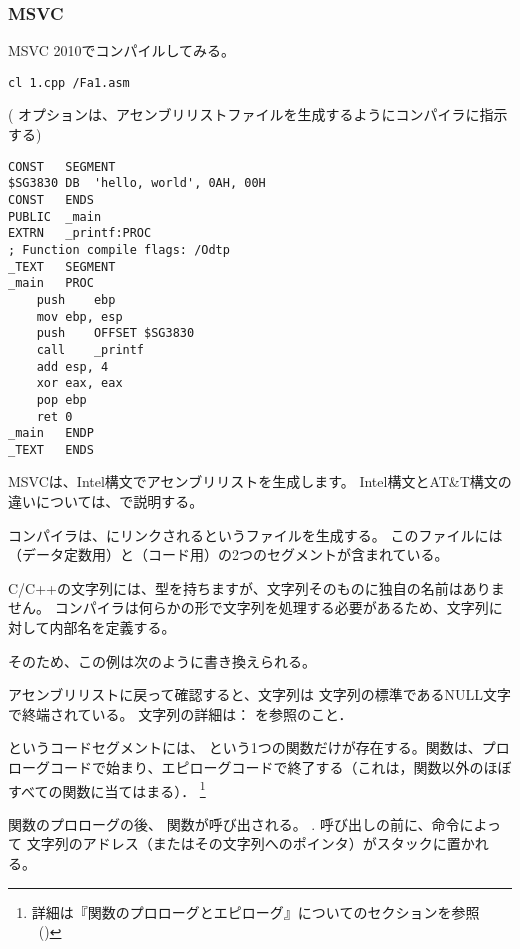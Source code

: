 \subsubsection{MSVC}

MSVC 2010でコンパイルしてみる。

\begin{lstlisting}
cl 1.cpp /Fa1.asm
\end{lstlisting}

( オプションは、アセンブリリストファイルを生成するようにコンパイラに指示する)

\begin{lstlisting}[caption=MSVC 2010,style=customasmx86]
CONST	SEGMENT
$SG3830	DB	'hello, world', 0AH, 00H
CONST	ENDS
PUBLIC	_main
EXTRN	_printf:PROC
; Function compile flags: /Odtp
_TEXT	SEGMENT
_main	PROC
	push	ebp
	mov	ebp, esp
	push	OFFSET $SG3830
	call	_printf
	add	esp, 4
	xor	eax, eax
	pop	ebp
	ret	0
_main	ENDP
_TEXT	ENDS
\end{lstlisting}

MSVCは、Intel構文でアセンブリリストを生成します。 Intel構文とAT\&T構文の違いについては、で説明する。

コンパイラは、にリンクされるというファイルを生成する。
このファイルには（データ定数用）と（コード用）の2つのセグメントが含まれている。

\label{string_is_const_char}
C/C++の文字列には、型を持ちますが、文字列そのものに独自の名前はありません。
コンパイラは何らかの形で文字列を処理する必要があるため、文字列に対して内部名を定義する。

そのため、この例は次のように書き換えられる。



アセンブリリストに戻って確認すると、文字列は \CCpp 文字列の標準であるNULL文字で終端されている。 \CCpp 文字列の詳細は：  を参照のこと．

というコードセグメントには、 \main{} という1つの関数だけが存在する。\main 関数は、プロローグコードで始まり、エピローグコードで終了する（これは，\main 関数以外のほぼすべての関数に当てはまる）．
\footnote{詳細は『関数のプロローグとエピローグ』についてのセクションを参照 ~()}

関数のプロローグの後、\printf{} 関数が呼び出される。
.
呼び出しの前に、\PUSH 命令によって  文字列のアドレス（またはその文字列へのポインタ）がスタックに置かれる。

